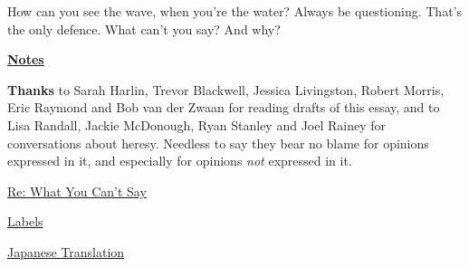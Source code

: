 How can you see the wave, when
                  you're the water? Always be questioning. That's the only
                  defence. What can't you say? And why?



\href{http://www.paulgraham.com/saynotes.html}{\underline{\textbf{Notes}}}

\textbf{Thanks} to Sarah Harlin, Trevor Blackwell,
                  Jessica Livingston, Robert Morris, Eric Raymond and Bob van
                  der Zwaan for reading drafts of this essay, and to Lisa
                  Randall, Jackie McDonough, Ryan Stanley and Joel Rainey for
                  conversations about heresy. Needless to say they bear no blame
                  for opinions expressed in it, and especially for opinions
                  \emph{not} expressed in it.



              
            
          

            
              
            
            
              
                
              
              
              
                \href{http://www.paulgraham.com/resay.html}{Re: What You Can't Say}


              
              
              
                
              
              
              
                \href{http://www.paulgraham.com/labels.html}{Labels}


              
            
            
              
            
            
              
                
              
              
              
                \href{http://www.shiro.dreamhost.com/scheme/trans/say-j.html}{Japanese Translation}


              
              
              
                
              
              
